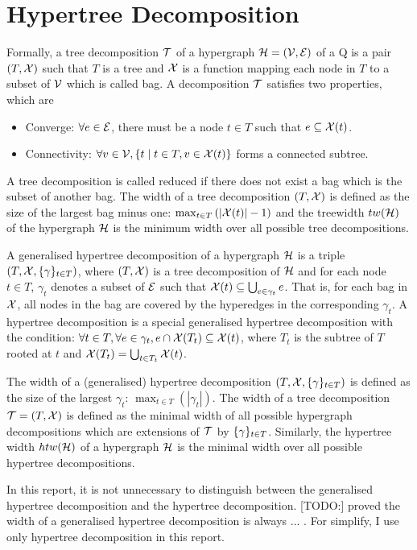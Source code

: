 \section{Hypertree Decomposition}
Formally, a tree decomposition $\mathcal{T}$ of a hypergraph
$\mathcal{H} = (\mathcal{V}, \mathcal{E})$ of a Q is a pair $(T, \mathcal{X})$ such that $T$ is a tree and $\mathcal{X}$ is a function mapping each node in $T$ to a subset of $\mathcal{V}$ which is called bag. A decomposition $\mathcal{T}$ satisfies two properties, which are 
\begin{itemize}
  \item Converge: $\forall e \in \mathcal{E}$, there must be a node $t \in T$ such that $e \subseteq \mathcal{X}(t)$. 
  \item Connectivity: $\forall v \in \mathcal{V}, \{t \mid t \in T, v \in \mathcal{X}(t)\}$ forms a connected subtree. 
\end{itemize}

A tree decomposition is called reduced if there does not exist a bag which is the subset of another bag. The width of a tree decomposition $(T, \mathcal{X})$ is defined as the size of the largest bag minus one: $\max_{t \in T}{(|\mathcal{X}(t)| - 1)}$ and the treewidth $tw(\mathcal{H})$ of the hypergraph $\mathcal{H}$ is the minimum width over all possible tree decompositions. 


A generalised hypertree decomposition of a hypergraph $\mathcal{H}$ is a triple $(T, \mathcal{X}, \{\gamma\}_{t \in T})$, where $(T, \mathcal{X})$ is a tree decomposition of $\mathcal{H}$ and for each node $t \in T$, $\gamma_t$ denotes a subset of $\mathcal{E}$ such that $\mathcal{X}(t) \subseteq \bigcup_{e \in \gamma_t}e$. That is, for each bag in $\mathcal{X}$, all nodes in the bag are covered by the hyperedges in the corresponding $\gamma_t$. A hypertree decomposition is a special generalised hypertree decomposition with the condition: $\forall t \in T, \forall e \in \gamma_t, e \cap \mathcal{X}(T_t) \subseteq \mathcal{X}(t)$, where $T_t$ is the subtree of $T$ rooted at $t$ and $\mathcal{X}(T_t) = \bigcup_{t \in T_t}\mathcal{X}(t)$. 

The width of a (generalised) hypertree decomposition $(T, \mathcal{X}, \{\gamma\}_{t \in T})$ is defined as the size of the largest $\gamma_t$: $\max_{t \in T}(|\gamma_t|)$. The width of a tree decomposition $\mathcal{T} = (T, \mathcal{X})$ is defined as the minimal width of all possible hypergraph decompositions which are extensions of $\mathcal{T}$ by $\{\gamma\}_{t \in T}$. Similarly, the hypertree width $htw(\mathcal{H})$ of a hypergraph $\mathcal{H}$ is the minimal width over all possible hypertree decompositions. 


In this report, it is not unnecessary to distinguish between the generalised hypertree decomposition and the hypertree decomposition. [TODO:] proved the width of a generalised hypertree decomposition is always ... . For simplify, I use only hypertree decomposition in this report. 

